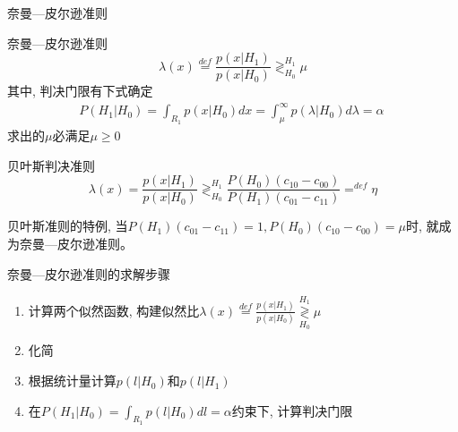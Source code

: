 \begin{frame}[shrink]{奈曼---皮尔逊准则}
\begin{block}{奈曼---皮尔逊准则}
	\[ \lambda(x)\mathop{=}\limits^{def}\frac{p(x|H_1)}{p(x|H_0)}\mathop{\gtrless}_{H_0}^{H_1}\mu \]
其中, 判决门限有下式确定
\begin{align*}
P(H_1|H_0)=\int_{R_1}p(x|H_0)dx=\int_{\mu}^{\infty}p(\lambda|H_0)d\lambda=\alpha\
\end{align*}
求出的$\mu$必满足$\mu\ge 0$
\end{block}
\begin{block}{贝叶斯判决准则}
	\[ \lambda(x)=\frac{p(x|H_1)}{p(x|H_0)}\mathop{\gtrless}_{H_0}^{H_1}\frac{P(H_0)(c_{10}-c_{00})}{P(H_1)(c_{01}-c_{11})}\mathop{=}^{def}\eta \]
\end{block}
贝叶斯准则的特例, 当$P(H_1)(c_{01}-c_{11})=1, P(H_0)(c_{10}-c_{00})=\mu$时, 就成为奈曼---皮尔逊准则。
\end{frame}

\begin{frame}[shrink]{奈曼---皮尔逊准则的求解步骤}
\begin{enumerate}
	\setlength{\itemsep}{.5cm}
	\item 计算两个似然函数, 构建似然比$\lambda(x)\mathop{=}\limits^{def}\frac{p(x|H_1)}{p(x|H_0)}\mathop{\gtrless}\limits_{H_0}^{H_1}\mu$
	\item 化简
	\item 根据统计量计算$p(l|H_0)$和$p(l|H_1)$
	\item 在$P(H_1|H_0)=\int_{R_1}p(l|H_0)dl=\alpha$约束下, 计算判决门限
\end{enumerate}
\end{frame}





